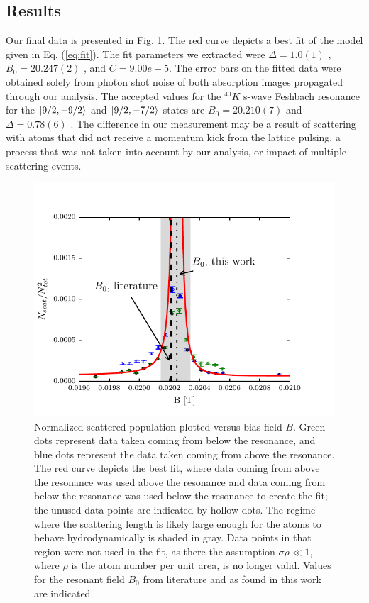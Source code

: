 \documentclass[12pt]{iopart}
\begin{document}
\subsection{Results}
Our final data is presented in Fig. \ref{fig:fittedFractions}. The red curve depicts a best fit of the model given in Eq. (\ref{eq:fit}). The fit parameters we extracted were $\Delta = 1.0(1)$  \mT{}, $B_0 = 20.247(2)$  \mT{}, and $C=9.00e-5$. The error bars on the fitted data were obtained solely from photon shot noise of both absorption images propagated through our analysis.
The accepted values for the $^{40}K$ s-wave Feshbach resonance for the  $\mathinner{|{9/2,-9/2}\rangle}$ and $\mathinner{|{9/2,-7/2}\rangle}$ states are $B_0=20.210(7)$  \mT{} and $\Delta=0.78(6)$  \mT{} \cite{Regal04}. The difference in our measurement may be a result of scattering with atoms that did not receive a momentum kick from the lattice pulsing, a process that was not taken into account by our analysis, or impact of multiple scattering events. 
\begin{figure}
	\includegraphics{figure11.pdf}
\caption{Normalized scattered population plotted versus bias field $B$. Green dots represent data taken coming from below the resonance, and blue dots represent the data taken coming from above the resonance. The red curve depicts the best fit, where data coming from above the resonance was used above the resonance and data coming from below the resonance was used below the resonance to create the fit; the unused data points are indicated by hollow dots. The regime where the scattering length is likely large enough for the atoms to behave hydrodynamically is shaded in gray. Data points in that region were not used in the fit, as there the assumption $\sigma\rho\ll1$, where $\rho$ is the atom number per unit area, is no longer valid. Values for the resonant field $B_0$ from literature and as found in this work are indicated.    }  
\label{fig:fittedFractions}
\end{figure}
\end{document}
